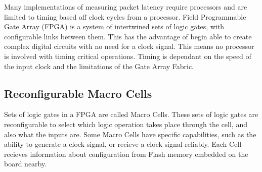 \par Many implementations of measuring packet latency require processors and are limited to timing based off clock cycles from a processor.
Field Programmable Gate Array (FPGA) is a system of intertwined sets of logic gates, with configurable links between them.
This has the advantage of begin able to create complex digital circuits with no need for a clock signal.
This means no processor is involved with timing critical operations.
Timing is dependant on the speed of the input clock and the limitations of the Gate Array Fabric.

\subsection{Reconfigurable Macro Cells}

\par Sets of logic gates in a FPGA are called Macro Cells. 
These sets of logic gates are reconfigurable to select which logic operation takes place through the cell, and also what the inputs are.
Some Macro Cells have specific capabilities, such as the ability to generate a clock signal, or recieve a clock signal reliably.
Each Cell recieves information about configuration from Flash memory embedded on the board nearby.

